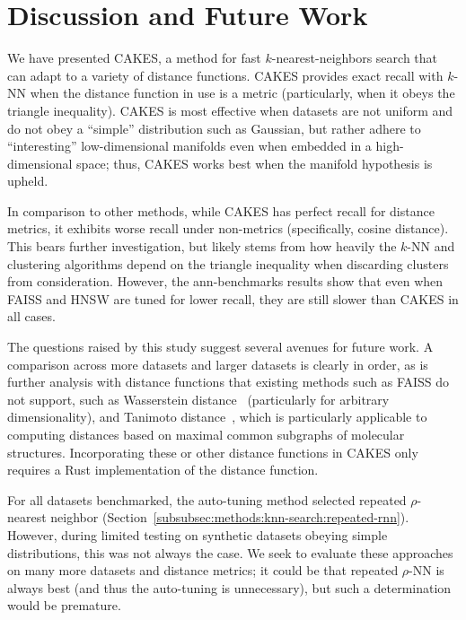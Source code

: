 \section{Discussion and Future Work}
\label{sec:discussion}

We have presented CAKES, a method for fast $k$-nearest-neighbors search that can adapt to a variety of distance functions.
CAKES provides exact recall with $k$-NN when the distance function in use is a metric (particularly, when it obeys the triangle inequality).
CAKES is most effective when datasets are not uniform and do not obey a ``simple'' distribution such as Gaussian, but rather adhere to ``interesting'' low-dimensional manifolds even when embedded in a high-dimensional space;
thus, CAKES works best when the manifold hypothesis is upheld.

In comparison to other methods, while CAKES has perfect recall for distance metrics, it exhibits worse recall under non-metrics (specifically, cosine distance). This bears further investigation, but likely stems from how heavily the $k$-NN and clustering algorithms depend on the triangle inequality when discarding clusters from consideration.
However, the ann-benchmarks results show that even when FAISS and HNSW are tuned for lower recall, they are still slower than CAKES in all cases.

The questions raised by this study suggest several avenues for future work.
A comparison across more datasets and larger datasets is clearly in order, as is further analysis with distance functions that existing methods such as FAISS do not support, such as Wasserstein distance~\cite{vallender1974calculation} (particularly for arbitrary dimensionality), and Tanimoto distance~\cite{bajusz2015tanimoto}, which is particularly applicable to computing distances based on maximal common subgraphs of molecular structures.  %
Incorporating these or other distance functions in CAKES only requires a Rust implementation of the distance function.

For all datasets benchmarked, the auto-tuning method selected repeated $\rho$-nearest neighbor (Section~\ref{subsubsec:methods:knn-search:repeated-rnn}).
However, during limited testing on synthetic datasets obeying simple distributions, this was not always the case.
We seek to evaluate these approaches on many more datasets and distance metrics;
it could be that repeated $\rho$-NN is always best (and thus the auto-tuning is unnecessary), but such a determination would be premature.

